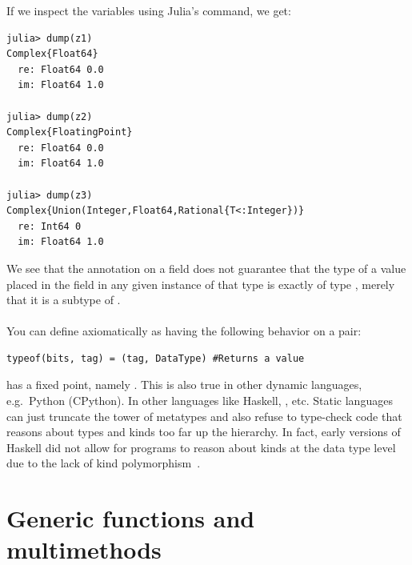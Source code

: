 \documentclass[pldi]{sigplanconf-pldi15}
\begin{document}
If we inspect the variables using Julia's  command, we get:

\begin{lstlisting}
julia> dump(z1)
Complex{Float64} 
  re: Float64 0.0
  im: Float64 1.0

julia> dump(z2)
Complex{FloatingPoint} 
  re: Float64 0.0
  im: Float64 1.0

julia> dump(z3)
Complex{Union(Integer,Float64,Rational{T<:Integer})} 
  re: Int64 0
  im: Float64 1.0
\end{lstlisting}
%
We see that the  annotation on a field does not guarantee that the
type of a value placed in the field in any given instance of that type is
exactly of type , merely that it is a subtype of .


\paragraph{}
You can define  axiomatically as having the following behavior on a  pair:

\begin{lstlisting}
typeof(bits, tag) = (tag, DataType) #Returns a value
\end{lstlisting}

 has a fixed point, namely . This is
also true in other dynamic languages, e.g.\ Python (CPython). In other
languages like Haskell, , etc. Static languages
can just truncate the tower of metatypes and also refuse to type-check code
that reasons about types and kinds too far up the hierarchy. In fact, early
versions of Haskell did not allow for programs to reason about kinds at the
data type level due to the lack of kind polymorphism~\cite{haskellkindtypes}.




\section{Generic functions and multimethods}
\end{document}
